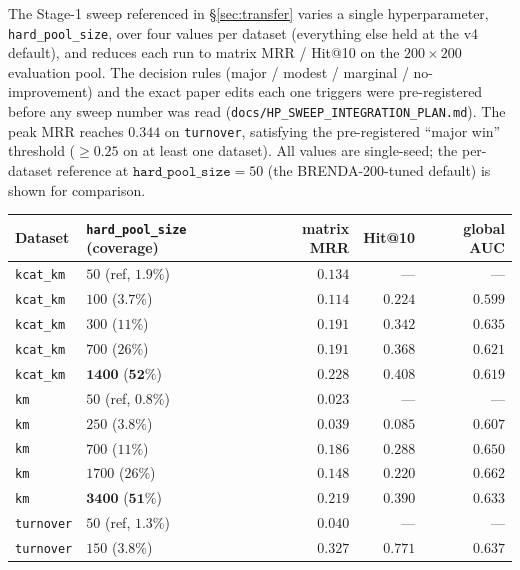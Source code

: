 \documentclass[11pt,a4paper]{article}
\newcommand{\gauc}{global AUC}
\newcommand{\matmrr}{matrix MRR}
\begin{document}
The Stage-1 sweep referenced in \S\ref{sec:transfer} varies a single
hyperparameter, \texttt{hard\_pool\_size}, over four values per dataset
(everything else held at the v4 default), and reduces each run to matrix
MRR / Hit@10 on the $200 \times 200$ evaluation pool. The decision rules
(major / modest / marginal / no-improvement) and the exact paper edits
each one triggers were pre-registered before any sweep number was read
(\texttt{docs/HP\_SWEEP\_INTEGRATION\_PLAN.md}). The peak MRR reaches
$0.344$ on \texttt{turnover}, satisfying the pre-registered
``major win'' threshold ($\ge 0.25$ on at least one dataset). All values
are single-seed; the per-dataset reference at $\texttt{hard\_pool\_size}=50$
(the BRENDA-200-tuned default) is shown for comparison.

\begin{table}[h]
  \centering
  \footnotesize
  \setlength{\tabcolsep}{6pt}
  \begin{tabular}{llrrr}
    \toprule
    Dataset & \texttt{hard\_pool\_size} (coverage) & \matmrr & Hit@10 & \gauc \\
    \midrule
    \texttt{kcat\_km} & $50$ (ref, $1.9\%$)  & $0.134$ & ---     & ---     \\
    \texttt{kcat\_km} & $100$ ($3.7\%$)       & $0.114$ & $0.224$ & $0.599$ \\
    \texttt{kcat\_km} & $300$ ($11\%$)        & $0.191$ & $0.342$ & $0.635$ \\
    \texttt{kcat\_km} & $700$ ($26\%$)        & $0.191$ & $0.368$ & $0.621$ \\
    \texttt{kcat\_km} & $\mathbf{1400}$ ($\mathbf{52\%}$) & $\mathbf{0.228}$ & $\mathbf{0.408}$ & $0.619$ \\
    \midrule
    \texttt{km}       & $50$ (ref, $0.8\%$)  & $0.023$ & ---     & ---     \\
    \texttt{km}       & $250$ ($3.8\%$)       & $0.039$ & $0.085$ & $0.607$ \\
    \texttt{km}       & $700$ ($11\%$)        & $0.186$ & $0.288$ & $0.650$ \\
    \texttt{km}       & $1700$ ($26\%$)       & $0.148$ & $0.220$ & $0.662$ \\
    \texttt{km}       & $\mathbf{3400}$ ($\mathbf{51\%}$) & $\mathbf{0.219}$ & $\mathbf{0.390}$ & $0.633$ \\
    \midrule
    \texttt{turnover} & $50$ (ref, $1.3\%$)  & $0.040$ & ---     & ---     \\
    \texttt{turnover} & $150$ ($3.8\%$)       & $0.327$ & $0.771$ & $0.637$ \\

\end{tabular}
\end{table}
\end{document}

